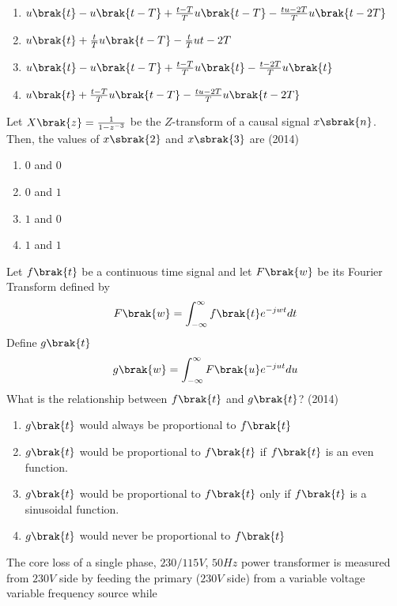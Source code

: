 		\begin{enumerate}
			\item $u\brak{t}-u\brak{t-T}+\frac{t-T}{T}u\brak{t-T}-\frac{tu-2T}{T}u\brak{t-2T}$
			\item $u\brak{t}+ \frac{t}{T}u\brak{t-T}-\frac{t}{T}u{t-2T}$
			\item $u\brak{t}-u\brak{t-T}+\frac{t-T}{T}u\brak{t}-\frac{t-2T}{T}u\brak{t}$
	        \item $u\brak{t}+\frac{t-T}{T}u\brak{t-T}-\frac{tu-2T}{T}u\brak{t-2T}$
        	\end{enumerate}
	\item Let $X\brak{z}=\frac{1}{1-z^{-3}}$ be the $Z$-transform of a causal signal $x\sbrak{n}$. Then, the values of $x\sbrak{2}$ and $x\sbrak{3}$ are
	\hfill{(2014)}
		\begin{enumerate}
		       \item $0$ and $0$
		       \item $0$ and $1$
		       \item $1$ and $0$
		       \item $1$ and $1$
        	\end{enumerate}	
	\item Let $f\brak{t}$ be a continuous time signal and let $F\brak{w}$ be its Fourier Transform defined by
 \begin{align*}
     F\brak{w}=\int_{-\infty}^{\infty}f\brak{t}e^{-jwt}dt
 \end{align*}
 Define $g\brak{t}$
 \begin{align*}
     g\brak{w}=\int_{-\infty}^{\infty}F\brak{u}e^{-jut}du
 \end{align*}
 What is the relationship between $f\brak{t}$ and $g\brak{t}$?
 \hfill{(2014)}
		\begin{enumerate}
			\item $g\brak{t}$ would always be proportional to $f\brak{t}$
			\item $g\brak{t}$ would be proportional to $f\brak{t}$ if $f\brak{t}$ is an even function.
			\item $g\brak{t}$ would be proportional to $f\brak{t}$ only if $f\brak{t}$ is a sinusoidal function.
			\item $g\brak{t}$ would never be proportional to $f\brak{t}$
        	\end{enumerate}
	\item The core loss of a single phase, $230/115 V$, $50 Hz$ power transformer is measured from $230 V$ side
by feeding the primary ($230 V$ side) from a variable voltage variable frequency source while
